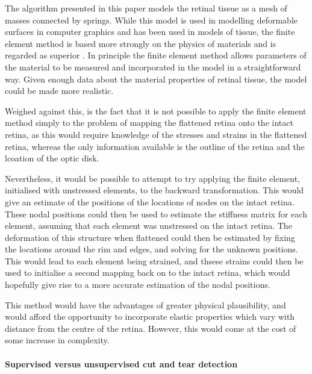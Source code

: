 \documentclass{article}
\begin{document}
The algorithm presented in this paper models the retinal tissue as a
mesh of masses connected by springs. While this model is used in
modelling deformable surfaces in computer graphics and has been used
in models of tissue, the finite element method is based more strongly
on the physics of materials and is regarded as superior
\citep{CartEtal05appl}. In principle the finite element method allows
parameters of the material to be measured and incorporated in the
model in a straightforward way. Given enough data about
the material properties of retinal tissue, the model could be made
more realistic. 

Weighed against this, is the fact that it is not possible to apply the
finite element method simply to the problem of mapping the flattened
retina onto the intact retina, as this would require knowledge of the
stresses and strains in the flattened retina, whereas the only
information available is the outline of the retina and the lcoation of
the optic disk. 

Nevertheless, it would be possible to attempt to try applying the
finite element, initialised with unstressed elements, to the backward
transformation. This would give an estimate of the positions of the
locations of nodes on the intact retina. These nodal positions could
then be used to estimate the stiffness matrix for each element,
assuming that each element was unstressed on the intact retina. The
deformation of this structure when flattened could then be estimated
by fixing the locations around the rim and edges, and solving for the
unknown positions. This would lead to each element being strained, and
thsese strains could then be used to initialise a second mapping back
on to the intact retina, which would hopefully give rise to a more
accurate estimation of the nodal positions. 

This method would have the advantages of greater physical plausibility,
and would afford the opportunity to incorporate elastic properties
which vary with distance from the centre of the retina. However, this
would come at the cost of some increase in complexity.

\paragraph{Supervised versus unsupervised cut and tear detection}
\label{fold-sphere:sec:superv-vers-unsup}
\end{document}
